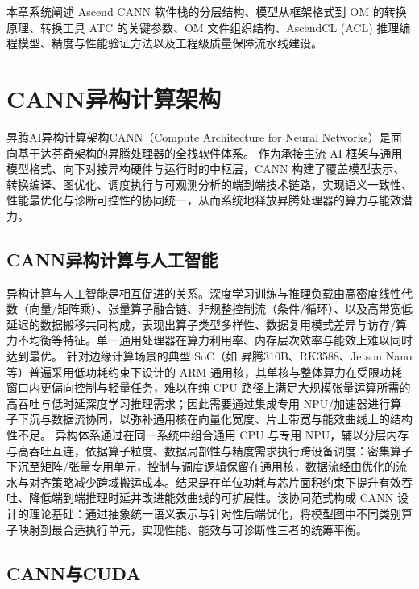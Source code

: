 本章系统阐述 Ascend CANN 软件栈的分层结构、模型从框架格式到 OM
的转换原理、转换工具 ATC 的关键参数、OM 文件组织结构、AscendCL (ACL)
推理编程模型、精度与性能验证方法以及工程级质量保障流水线建设。

\section{CANN异构计算架构}\label{src-book-chapter2-h1}

昇腾AI异构计算架构CANN（Compute Architecture for Neural
Networks）是面向基于达芬奇架构的昇腾处理器的全栈软件体系。 作为承接主流
AI 框架与通用模型格式、向下对接异构硬件与运行时的中枢层，CANN
构建了覆盖模型表示、转换编译、图优化、调度执行与可观测分析的端到端技术链路，实现语义一致性、性能最优化与诊断可控性的协同统一，从而系统地释放昇腾处理器的算力与能效潜力。

\subsection{CANN异构计算与人工智能}\label{src-book-chapter2-h2}

异构计算与人工智能是相互促进的关系。深度学习训练与推理负载由高密度线性代数（向量/矩阵乘）、张量算子融合链、非规整控制流（条件/循环）、以及高带宽低延迟的数据搬移共同构成，表现出算子类型多样性、数据复用模式差异与访存/算力不均衡等特征。单一通用处理器在算力利用率、内存层次效率与能效上难以同时达到最优。
针对边缘计算场景的典型 SoC（如 昇腾310B、RK3588、Jetson Nano
等）普遍采用低功耗约束下设计的 ARM
通用核，其单核与整体算力在受限功耗窗口内更偏向控制与轻量任务，难以在纯
CPU
路径上满足大规模张量运算所需的高吞吐与低时延深度学习推理需求；因此需要通过集成专用
NPU/加速器进行算子下沉与数据流协同，以弥补通用核在向量化宽度、片上带宽与能效曲线上的结构性不足。
异构体系通过在同一系统中组合通用 CPU 与专用
NPU，辅以分层内存与高吞吐互连，依据算子粒度、数据局部性与精度需求执行跨设备调度：密集算子下沉至矩阵/张量专用单元，控制与调度逻辑保留在通用核，数据流经由优化的流水与对齐策略减少跨域搬运成本。结果是在单位功耗与芯片面积约束下提升有效吞吐、降低端到端推理时延并改进能效曲线的可扩展性。该协同范式构成
CANN
设计的理论基础：通过抽象统一语义表示与针对性后端优化，将模型图中不同类别算子映射到最合适执行单元，实现性能、能效与可诊断性三者的统筹平衡。

\subsection{CANN与CUDA}\label{src-book-chapter2-h3}

